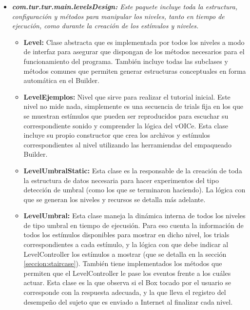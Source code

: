 \documentclass{article}
\numberwithin{figure}{section}
\begin{document}
\begin{itemize}
        \item \textit{\textbf{com.tur.tur.main.levelsDesign:} Este paquete incluye toda la estructura, configuración y métodos para manipular los niveles, tanto en tiempo de ejecución, como durante la creación de los estímulos y niveles.}
        \begin{itemize}
            \item \textbf{Level:} Clase abstracta que es implementada por todos los niveles a modo de interfaz para asegurar que dispongan de los métodos necesarios para el funcionamiento del programa. También incluye todas las subclases y métodos comunes que permiten generar estructuras conceptuales en forma automática en el Builder. 
            \item \textbf{LevelEjemplos:} Nivel que sirve para realizar el tutorial inicial. Este nivel no mide nada, simplemente es una secuencia de trials fija en los que se muestran estímulos que pueden ser reproducidos para escuchar su correspondiente sonido y comprender la lógica del vOICe. Esta clase incluye su propio constructor que crea los archivos y estímulos correspondientes al nivel utilizando las herramiendas del empaqueado Builder. 
            \item \textbf{LevelUmbralStatic:} Esta clase es la responsable de la creación de toda la estructura de datos necesaria para hacer experimentos del tipo detección de umbral (como los que se terminaron haciendo). La lógica con que se generan los niveles y recursos se detalla más adelante.
            \item \textbf{LevelUmbral:} Esta clase maneja la dinámica interna de todos los niveles de tipo umbral en tiempo de ejecusión. Para eso cuenta la información de todos los estímulos disponibles para mostrar en dicho nivel, los trials correspondientes a cada estímulo, y la lógica con que debe indicar al LevelController los estímulos a mostrar (que se detalla en la sección \ref{seccion:staircase}). También tiene implementados los métodos que permiten que el LevelController le pase los eventos frente a los cuáles actuar. Esta clase es la que observa si el Box tocado por el usuario se corresponde con la respuesta adecuada, y la que lleva el registro del desempeño del sujeto que es enviado a Internet al finalizar cada nivel. 
        \end{itemize}
        

\end{itemize}
\end{document}
